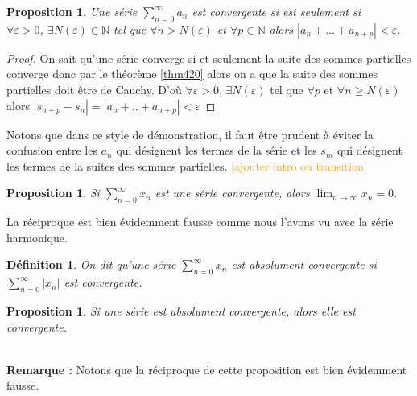 \documentclass[a4paper, 12pt, french, twoside]{article}
\newtheorem{proposition}[theorem]{Proposition}
\newtheorem{defi}[theorem]{Définition}
\newcommand{\Nn}{{\mathbb{N}}}
\newcommand{\later}[1]{\textcolor{orange}{[#1]}}
\begin{document}
\begin{proposition}
    Une série $\sum_{n = 0}^{\infty} a_n$ est convergente si est seulement si 
    \\\quad $ \forall \varepsilon > 0$, $\exists N(\varepsilon) \in \Nn $ tel que $\forall n > N(\varepsilon)$ et $\forall p \in \Nn $ alors $|a_n + ... + a_{n+p}| < \varepsilon$. 
\end{proposition}
\begin{proof}
   On sait qu'une série converge si et seulement la suite des sommes partielles converge donc par le théorème \ref{thm420} alors on a que la suite des sommes partielles doit être de Cauchy. D'où $\forall \varepsilon >0 $, $\exists N(\varepsilon)$ tel que $\forall p$ et $\forall n \ge N(\varepsilon)$ alors $|s_{n+p} - s_n| = | a_n + .. + a_{n+p}| < \varepsilon$ 
\end{proof}
Notons que dans ce style de démonstration, il faut être prudent à éviter la confusion entre les $a_n$ qui désignent les termes de la série et les $s_m$ qui désignent les termes de la suites des sommes partielles. 
\later{ajouter intro ou transition}
\begin{proposition}
    Si $\sum_{n=0}^{\infty} x_n$ est une série convergente, alors $\lim_{n\rightarrow\infty}x_n=0$.
\end{proposition}
 La réciproque est bien évidemment fausse comme nous l'avons vu avec la série harmonique. 
\begin{defi}
    On dit qu'une série $\sum_{n=0}^{\infty} x_n$ est absolument convergente si $\sum_{n=0}^{\infty} |x_n|$ est convergente.
\end{defi}

\begin{proposition}
    Si une série est absolument convergente, alors elle est convergente.
\end{proposition}
\newline 
\\ \textbf{Remarque :} Notons que la réciproque de cette proposition est bien évidemment fausse. \newline 
\hline 
\hline
\newpage
\end{document}
